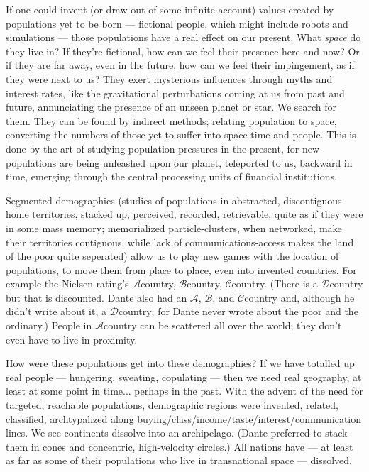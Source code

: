 \documentclass[11pt,twoside,draft]{memoir}
\newcommand{\cA}{$\mathcal{A}$}
\newcommand{\cB}{$\mathcal{B}$}
\newcommand{\cC}{$\mathcal{C}$}
\newcommand{\cD}{$\mathcal{D}$}
\begin{document}
If one could invent (or draw out of some
infinite account) values created by populations yet to be born --- fictional people, which
might include robots and simulations --- those
populations have a real effect on our present.
What \emph{space} do they live in? If they're fictional, how can we feel their presence here
and now? Or if they are far away, even in the future, how can we feel their impingement,
as if they were next to us? They exert mysterious influences through myths and interest rates, like the gravitational perturbations
coming at us from past and future,
annunciating the presence of an unseen
planet or star. We search for them. They can
be found by indirect methods; relating population to space, converting the numbers of
those-yet-to-suffer into space time and people. This is done by the art of studying
population pressures in the present, for new
populations are being unleashed upon our
planet, teleported to us, backward
in time, emerging through the central processing
units of financial institutions.

Segmented demographics (studies of populations
in abstracted, discontiguous home territories, stacked up, perceived, recorded,
retrievable, quite as if they were in some mass
memory; memorialized particle-clusters, when networked, make their territories contiguous, while lack of communications-access makes the land of the poor quite seperated) allow us to play new games with the
location of populations, to move them from place to place, even into invented countries.
For example the Nielsen rating's \cA country, \cB country, \cC country. (There is a \cD country
but that is discounted. Dante also had an \cA, \cB, and \cC country and, although he didn't
write about it, a \cD country; for Dante never wrote about the poor and the ordinary.)
People in \cA country can be scattered all over
the world; they don't even have to live in
proximity.

How were these populations get into these demographies? If we have totalled up real people --- hungering, sweating, copulating --- then we need real geography, at least at some point in time... perhaps in the past. With the advent of the need for targeted, reachable populations, demographic regions were invented, related, classified, archtypalized along buying\slash class\slash income\slash taste\slash interest\slash communication lines. We see continents dissolve into an archipelago. (Dante preferred to stack them in cones and concentric, high-velocity circles.) All nations have --- at least as far as some of their populations who live in transnational space --- dissolved.
\end{document}
